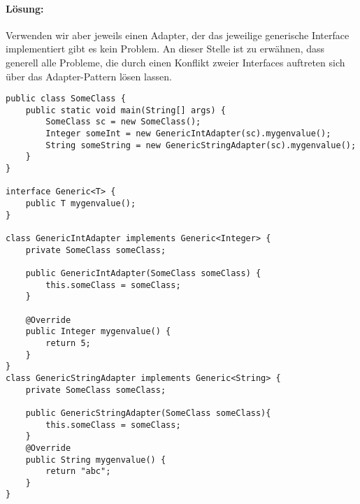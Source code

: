\documentclass[a4paper, 1ppt]{article}
\begin{document}
\paragraph{Lösung:}
Verwenden wir aber jeweils einen Adapter, der das jeweilige generische Interface implementiert gibt es kein Problem.
An dieser Stelle ist zu erwähnen, dass generell alle Probleme, die durch einen Konflikt zweier Interfaces auftreten sich über das Adapter-Pattern lösen lassen.
\begin{verbatim}
public class SomeClass {
    public static void main(String[] args) {
        SomeClass sc = new SomeClass();
        Integer someInt = new GenericIntAdapter(sc).mygenvalue();
        String someString = new GenericStringAdapter(sc).mygenvalue();
    }
}

interface Generic<T> {
    public T mygenvalue();
}

class GenericIntAdapter implements Generic<Integer> {
    private SomeClass someClass;

    public GenericIntAdapter(SomeClass someClass) {
        this.someClass = someClass;
    }

    @Override
    public Integer mygenvalue() {
        return 5;
    }
}
class GenericStringAdapter implements Generic<String> {
    private SomeClass someClass;

    public GenericStringAdapter(SomeClass someClass){
        this.someClass = someClass;
    }
    @Override
    public String mygenvalue() {
        return "abc";
    }
}
\end{verbatim}
\end{document}
